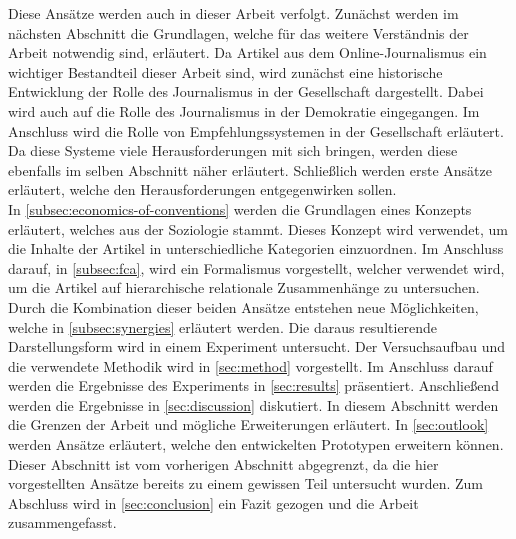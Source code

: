 Diese Ansätze werden auch in dieser Arbeit verfolgt.
Zunächst werden im nächsten Abschnitt die Grundlagen, welche für das weitere Verständnis der Arbeit notwendig sind, erläutert.
Da Artikel aus dem Online-Journalismus ein wichtiger Bestandteil dieser Arbeit sind, wird zunächst eine historische Entwicklung der Rolle des Journalismus in der Gesellschaft dargestellt.
Dabei wird auch auf die Rolle des Journalismus in der Demokratie eingegangen.
Im Anschluss wird die Rolle von Empfehlungssystemen in der Gesellschaft erläutert.
Da diese Systeme viele Herausforderungen mit sich bringen, werden diese ebenfalls im selben Abschnitt näher erläutert.
Schließlich werden erste Ansätze erläutert, welche den Herausforderungen entgegenwirken sollen. \\

In \autoref{subsec:economics-of-conventions} werden die Grundlagen eines Konzepts erläutert, welches aus der Soziologie stammt.
Dieses Konzept wird verwendet, um die Inhalte der Artikel in unterschiedliche Kategorien einzuordnen.
Im Anschluss darauf, in \autoref{subsec:fca}, wird ein Formalismus vorgestellt, welcher verwendet wird, um die Artikel auf hierarchische relationale Zusammenhänge zu untersuchen.
Durch die Kombination dieser beiden Ansätze entstehen neue Möglichkeiten, welche in \autoref{subsec:synergies} erläutert werden.
Die daraus resultierende Darstellungsform wird in einem Experiment untersucht.
Der Versuchsaufbau und die verwendete Methodik wird in \autoref{sec:method} vorgestellt.
Im Anschluss darauf werden die Ergebnisse des Experiments in \autoref{sec:results} präsentiert.
Anschließend werden die Ergebnisse in \autoref{sec:discussion} diskutiert.
In diesem Abschnitt werden die Grenzen der Arbeit und mögliche Erweiterungen erläutert.
In \autoref{sec:outlook} werden Ansätze erläutert, welche den entwickelten Prototypen erweitern können.
Dieser Abschnitt ist vom vorherigen Abschnitt abgegrenzt, da die hier vorgestellten Ansätze bereits zu einem gewissen Teil untersucht wurden.
Zum Abschluss wird in \autoref{sec:conclusion} ein Fazit gezogen und die Arbeit zusammengefasst.
